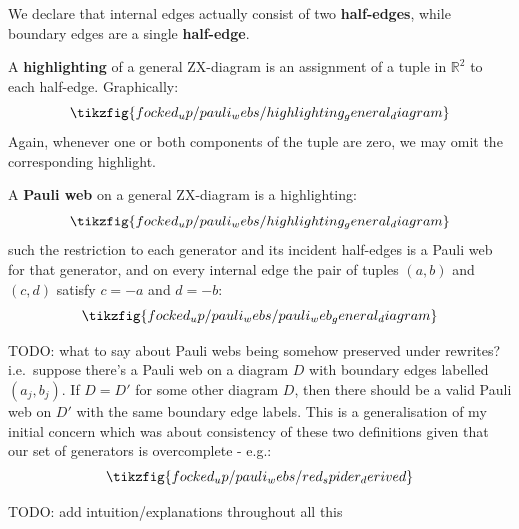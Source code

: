 \begin{definition}\label{defn:half_edges}
We declare that internal edges actually consist of two \textbf{half-edges}, while boundary edges are a single \textbf{half-edge}.
\end{definition}

\begin{definition}\label{defn:highlighting_general_diagram}
A \textbf{highlighting} of a general ZX-diagram is an assignment of a tuple in $\mathbb{R}^2$ to each half-edge.
Graphically:
\begin{equation}\label{eq:highlighting_general_diagram}
\tikzfig{focked_up/pauli_webs/highlighting_general_diagram}
\end{equation}
Again, whenever one or both components of the tuple are zero, we may omit the corresponding highlight.
\end{definition}

\begin{definition}\label{defn:pauli_web_general_diagram}
A \textbf{Pauli web} on a general ZX-diagram is a highlighting:
\begin{equation}\label{eq:pauli_web_general_diagram_highlighting}
\tikzfig{focked_up/pauli_webs/highlighting_general_diagram}
\end{equation}
such the restriction to each generator and its incident half-edges is a Pauli web for that generator, and on every internal edge the pair of tuples $(a, b)$ and $(c, d)$ satisfy $c = -a$ and $d = -b$:
\begin{equation}\label{eq:pauli_web_general_diagram_conditions}
\tikzfig{focked_up/pauli_webs/pauli_web_general_diagram}
\end{equation}
\end{definition}

TODO: what to say about Pauli webs being somehow preserved under rewrites?
i.e.\ suppose there's a Pauli web on a diagram $D$ with boundary edges labelled $(a_j, b_j)$.
If $D = D'$ for some other diagram $D$, then there should be a valid Pauli web on $D'$ with the same boundary edge labels.
This is a generalisation of my initial concern which was about consistency of these two definitions given that our set of generators is overcomplete - e.g.:
\begin{equation}\label{eq:red_spider_derived}
\tikzfig{focked_up/pauli_webs/red_spider_derived}
\end{equation}

TODO: add intuition/explanations throughout all this

